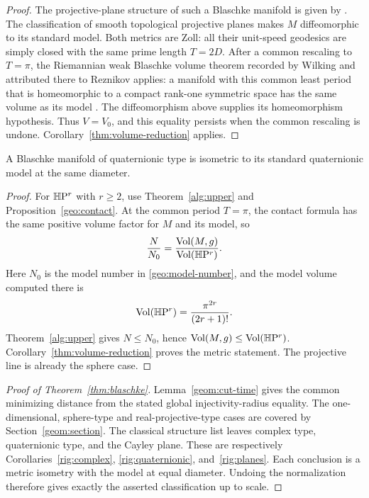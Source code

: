 \begin{proof}
The projective-plane structure of such a Blaschke manifold is
given by \citet[Lemma~5]{McKay2016}. The classification of smooth
topological projective planes
\citep[Corollary~C]{KramerStolz2007} makes $M$ diffeomorphic to
its standard model. Both metrics are Zoll: all their unit-speed
geodesics are simply closed with the same prime length $T=2D$.
After a common rescaling to $T=\pi$, the Riemannian weak Blaschke
volume theorem recorded by Wilking and attributed there to
Reznikov applies: a manifold with this common least period
that is homeomorphic to a compact rank-one symmetric space has
the same volume as its model \citep[p.~282]{Wilking2001}.
The diffeomorphism above supplies its homeomorphism hypothesis.
Thus $V=V_0$, and this equality persists when the common rescaling
is undone. Corollary~\ref{thm:volume-reduction} applies.
\end{proof}

\begin{corollary}\label{rig:quaternionic}
A Blaschke manifold of quaternionic type is isometric to its
standard quaternionic model at the same diameter.
\end{corollary}

\begin{proof}
For $\mathbb H\mathrm P^r$ with $r\ge2$, use Theorem~\ref{alg:upper} and
Proposition~\ref{geo:contact}. At the common period $T=\pi$, the
contact formula has the same positive volume factor for $M$ and its
model, so
\[
 \frac{N}{N_0}=\frac{\operatorname{Vol}(M,g)}{\operatorname{Vol}(\mathbb H\mathrm P^r)}.
\]
Here $N_0$ is the model number in \eqref{geo:model-number}, and the
model volume computed there is
\[
 \operatorname{Vol}(\mathbb H\mathrm P^r)=\frac{\pi^{2r}}{(2r+1)!}.
\]
Theorem~\ref{alg:upper} gives $N\le N_0$, hence
$\operatorname{Vol}(M,g)\le\operatorname{Vol}(\mathbb H\mathrm P^r)$.
Corollary~\ref{thm:volume-reduction} proves the metric statement.
The projective line is already the sphere case.
\end{proof}

\begin{proof}[Proof of Theorem~\ref{thm:blaschke}]
Lemma~\ref{geom:cut-time} gives the common minimizing distance
from the stated global injectivity-radius equality. The
one-dimensional, sphere-type and real-projective-type cases
are covered by Section~\ref{geom:section}. The classical
structure list leaves complex type, quaternionic type, and the
Cayley plane. These are respectively
Corollaries~\ref{rig:complex}, \ref{rig:quaternionic},
and~\ref{rig:planes}. Each conclusion is a metric isometry
with the model at equal diameter. Undoing the normalization
therefore gives exactly the asserted classification up to scale.
\end{proof}
